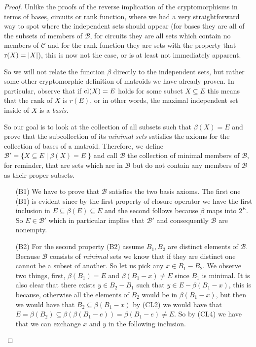 \begin{proof}
    Unlike the proofs of the reverse implication of the cryptomorphisms in terms of bases, circuits or rank function, where we had a very straightforward way to spot where the independent sets should appear (for bases they are all of the subsets of members of $\mathcal{B}$, for circuits they are all sets which contain no members of $\mathcal{C}$ and for the rank function they are sets with the property that $\operatorname{r}(X) = |X|$), this is now not the case, or is at least not immediately apparent.

    So we will not relate the function $\beta$ directly to the independent sets, but rather some other cryptomorphic definition of matroids we have already proven. In particular, observe that if $\mathrm{cl}(X) = E$ holds for some subset $X \subseteq E$ this means that the rank of $X$ is $r(E)$, or in other words, the maximal independent set inside of $X$ is a \textit{basis.}

    So our goal is to look at the collection of all subsets such that $\beta(X)= E$ and prove that the subcollection of its \textit{minimal sets} satisfies the axioms for the collection of bases of a matroid. Therefore, we define $\mathcal{B}' = \{X \subseteq E\; |\; \beta(X) = E\;\}$ and call $\mathcal{B}$ the collection of minimal members of $\mathcal{B}$, for reminder, that are sets which are in $\mathcal{B}$ but do not contain any members of $\mathcal{B}$ as their proper subsets.


\begin{enumerate}

\item[(B1)] We have to prove that $\mathcal{B}$ satisfies the two basis axioms. The first one (B1) is evident since by the first property of closure operator we have the first inclusion in $E\subseteq\beta(E) \subseteq E$ and the second follows because $\beta$ maps into $2^E$. So $E \in \mathcal{B}'$ which in particular implies that $\mathcal{B}'$ and consequently $\mathcal{B}$ are nonempty.

\item[(B2)]
    For the second property (B2) assume $B_1, B_2$ are distinct elements of $\mathcal{B}.$ Because $\mathcal{B}$ consists of \textit{minimal} sets we know that if they are distinct one cannot be a subset of another. So let us pick any $x \in B_1 - B_2$.
    We observe two things, first, $\beta(B_1) = E$ and $\beta(B_1 - x) \neq E$ since $B_1$ is minimal. It is also clear that there exists $y \in B_2 - B_1$ such that $y \in E - \beta(B_1 - x)$, this is because, otherwise all the elements of $B_2$ would be in $\beta(B_1-x)$, but then we would have that $B_2 \subseteq \beta(B_1 - x)$ by (CL2) we would have that $E = \beta(B_2)\subseteq \beta(\beta(B_1 - e)) = \beta(B_1 - e) \neq E$. So by (CL4) we have that we can exchange $x$ and $y$ in the following inclusion.
    

\end{enumerate}
\end{proof}
